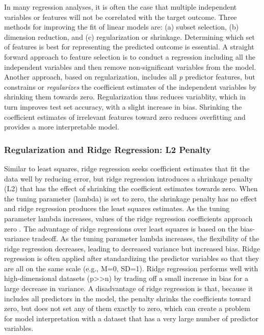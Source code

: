 \documentclass[sigconf]{acmart}
\begin{document}
In many regression analyses, it is often the case that multiple independent 
variables or features will not be correlated with the target outcome. Three 
methods for improving the fit of linear models are: (a) subset selection, 
(b) dimension reduction, and (c) regularization or shrinkage. Determining 
which set of features is best for representing the predicted outcome is 
essential. A straight forward approach to feature selection is to conduct a 
regression including all the independent variables and then remove 
non-significant variables from the model. Another approach, based on 
regularization, includes all \textit{p} predictor features, but constrains 
or \textit{regularizes} the coefficient estimates of the independent variables
by shrinking them towards zero. Regularization thus reduces variablity, 
which in turn improves test set accuracy, with a slight increase in bias. 
Shrinking the coefficient estimates of irrelevant features toward zero reduces 
overfitting and provides a more interpretable model. 


\subsubsection{Regularization and Ridge Regression: L2 Penalty} 

Similar to least squares, ridge regression seeks coefficient estimates that 
fit the data well by reducing error, but ridge regression introduces a 
shrinkage penalty (L2) that has the effect of shrinking the coefficient 
estimates towards zero. When the tuning parameter (lambda) is set to zero, 
the shrinkage penalty has no effect and ridge regression produces the least
squares estimates. As the tuning parameter lambda increases, values of the 
ridge regression coefficients approach zero \cite{statlearn13}. The advantage 
of ridge regressions over least squares is based on the bias-variance tradeoff. 
As the tuning parameter lambda increases, the flexibility of the ridge 
regression decreases, leading to decreased variance but increased bias. 
Ridge regression is often applied after standardizing the predictor variables 
so that they are all on the same scale (e.g., M=0, SD=1). Ridge regression 
performs well with high-dimensional datasets (p>>n) by trading off a small 
increase in bias for a large decrease in variance. A disadvantage of ridge
regression is that, because it includes all predictors in the model, the penalty 
shrinks the coefficients toward zero, but does not set any of them exactly to 
zero, which can create a problem for model interpretation with a dataset that 
has a very large number of predictor variables. 
\end{document}
